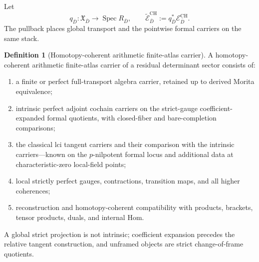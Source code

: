 \documentclass[11pt]{article}
\theoremstyle{definition}
\newtheorem{definition}[theorem]{Definition}
\begin{document}
Let
\[
q_{\bar D}:\mathfrak X_{\bar D}\to\operatorname{Spec}R_{\bar D},
\qquad
\widetilde{\mathcal E}^{\mathrm{CH}}_{\bar D}:=q_{\bar D}^{*}\mathcal E^{\mathrm{CH}}_{\bar D}.
\]
The pullback places global transport and the pointwise formal carriers on the same stack.

\begin{definition}[Homotopy-coherent arithmetic finite-atlas carrier]\label{def:homotopy-finite-atlas}
A homotopy-coherent arithmetic finite-atlas carrier of a residual determinant sector consists of:
\begin{enumerate}
\item a finite or perfect full-transport algebra carrier, retained up to derived Morita equivalence;
\item intrinsic perfect adjoint cochain carriers on the strict-gauge coefficient-expanded formal quotients, with closed-fiber and bare-completion comparisons;
\item the classical lci tangent carriers and their comparison with the intrinsic carriers---known on the $p$-nilpotent formal locus and additional data at characteristic-zero local-field points;
\item local strictly perfect gauges, contractions, transition maps, and all higher coherences;
\item reconstruction and homotopy-coherent compatibility with products, brackets, tensor products, duals, and internal Hom.
\end{enumerate}
A global strict projection is not intrinsic; coefficient expansion precedes the relative tangent construction, and unframed objects are strict change-of-frame quotients.
\end{definition}
\end{document}
